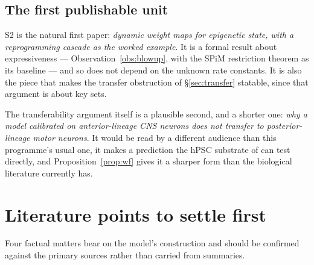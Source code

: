 \documentclass[11pt,a4paper]{article}
\theoremstyle{plain}
\theoremstyle{definition}
\theoremstyle{remark}
\begin{document}
\subsection{The first publishable unit}

S2 is the natural first paper: \emph{dynamic weight maps for epigenetic state,
with a reprogramming cascade as the worked example}. It is a formal result
about expressiveness --- Observation~\ref{obs:blowup}, with the SPiM
restriction theorem as its baseline --- and so does not depend on the unknown
rate constants. It is also the piece that makes the transfer obstruction of
\S\ref{sec:transfer} statable, since that argument is about key sets.

The transferability argument itself is a plausible second, and a shorter one:
\emph{why a model calibrated on anterior-lineage CNS neurons does not transfer
to posterior-lineage motor neurons}. It would be read by a different audience
than this programme's usual one, it makes a prediction the hPSC substrate of
\cite{TwoOrgans} can test directly, and
Proposition~\ref{prop:wf} gives it a sharper form than the biological
literature currently has.

\section{Literature points to settle first}\label{sec:settle}

Four factual matters bear on the model's construction and should be confirmed
against the primary sources rather than carried from summaries.
\end{document}
